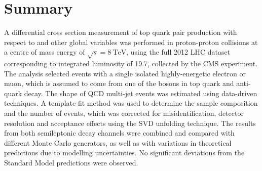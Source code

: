 \newpage
\section{Summary}
\label{s_xsection:summary}
A differential cross section measurement of top quark pair production with respect to \MET and other global variables
was performed in proton-proton collisions at a centre of mass energy of $\sqrt{s} = \SI{8}{\TeV}$, using the full 2012
LHC dataset corresponding to integrated luminosity of \SI{19.7}{\fbinv}, collected by the CMS experiment. The analysis
selected events with a single isolated highly-energetic electron or muon, which is assumed to come from one of the \W
bosons in top quark and anti-quark decay. The shape of QCD multi-jet events was estimated using data-driven techniques.
A template fit method was used to determine the sample composition and the number of \ttbar events, which was corrected
for misidentification, detector resolution and acceptance effects using the SVD unfolding technique. The results from
both semileptonic decay channels were combined and compared with different Monte Carlo generators, as well as with
variations in theoretical predictions due to modelling uncertainties. No significant deviations from the Standard Model
predictions were observed.

